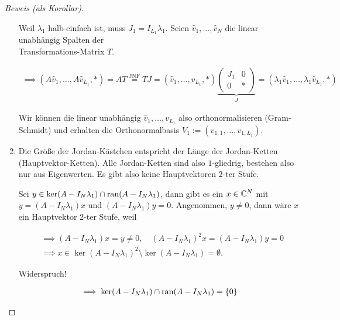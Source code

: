 \begin{proof}[Beweis (als Korollar)]
\begin{enumerate}[label = \arabic*.]
        Weil $\lambda_1$ halb-einfach ist, muss $J_1 = I_{L_1} \lambda_1$.
        Seien $\hat v_1, \dots, \hat v_N$ die linear unabhängig Spalten der \\ Transformations-Matrix $T$.
    
        \begin{align*}
            \implies
            (A \hat v_1, \dots, A \hat v_{L_1}, \ast)
            =
            A T
            \stackrel
            {
                \text{JNF}
            }{=}
            T J
            =
            (\hat v_1, \dots, \hat v_{L_1}, \ast)
            \underbrace
            {
                \begin{pmatrix}
                    J_1 & 0 \\
                    0   & \ast
                \end{pmatrix}
            }_J
            =
            (\lambda_1 \hat v_1, \dots, \lambda_1 \hat v_{L_1}, \ast)
        \end{align*}
    
        Wir können die linear unabhängig $\hat v_1, \dots, v_{L_1}$ also orthonormalisieren (Gram-Schmidt) und erhalten die Orthonormalbasis $V_1 := (v_{1, 1}, \dots, v_{1, L_1})$.

        \item Die Größe der Jordan-Kästchen entspricht der Länge der Jordan-Ketten (Hauptvektor-Ketten).
        Alle Jordan-Ketten sind also $1$-gliedrig, bestehen also nur aus  Eigenwerten.
        Es gibt also keine Hauptvektoren $2$-ter Stufe.
    
        Sei $y \in \ker (A - I_N \lambda_1) \cap \operatorname{ran} (A - I_N \lambda_1)$, dann gibt es ein $x \in \mathbb{C}^N$ mit $y = (A - I_N \lambda_1) x$ und $(A - I_N \lambda_1) y = 0$.
        Angenommen, $y \neq 0$, dann wäre $x$ ein Hauptvektor $2$-ter Stufe, weil

        \begin{align*}
            & \implies
            (A - I_N \lambda_1) x = y \neq 0,
            \quad
            (A - I_N \lambda_1)^2 x = (A - I_N \lambda_1) y = 0 \\
            & \implies
            x \in \ker (A - I_N \lambda_1)^2 \setminus \ker (A - I_N \lambda_1) = \emptyset.
        \end{align*}

        Widerspruch!
    
        \begin{align*}
            \implies
            \ker (A - I_N \lambda_1) \cap \operatorname{ran} (A - I_N \lambda_1) = {\left \{ 0 \right \}}
        \end{align*}
    

\end{enumerate}
\end{proof}
